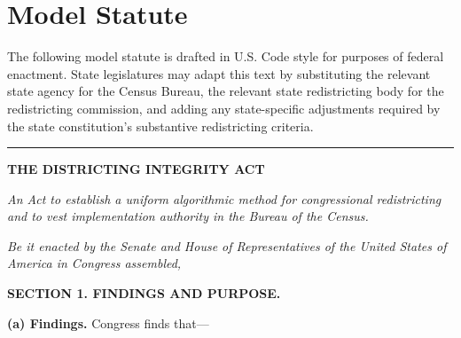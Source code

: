 \section{Model Statute}
\label{sec:model}

The following model statute is drafted in U.S. Code style for purposes of federal enactment. State legislatures may adapt this text by substituting the relevant state agency for the Census Bureau, the relevant state redistricting body for the redistricting commission, and adding any state-specific adjustments required by the state constitution's substantive redistricting criteria.

\medskip

\noindent\rule{\linewidth}{0.4pt}

\bigskip

\noindent\textbf{THE DISTRICTING INTEGRITY ACT}

\textit{An Act to establish a uniform algorithmic method for congressional redistricting and to vest implementation authority in the Bureau of the Census.}

\noindent\textit{Be it enacted by the Senate and House of Representatives of the United States of America in Congress assembled,}

\bigskip

\noindent\textbf{SECTION 1. FINDINGS AND PURPOSE.}

\textbf{(a) Findings.} Congress finds that---

